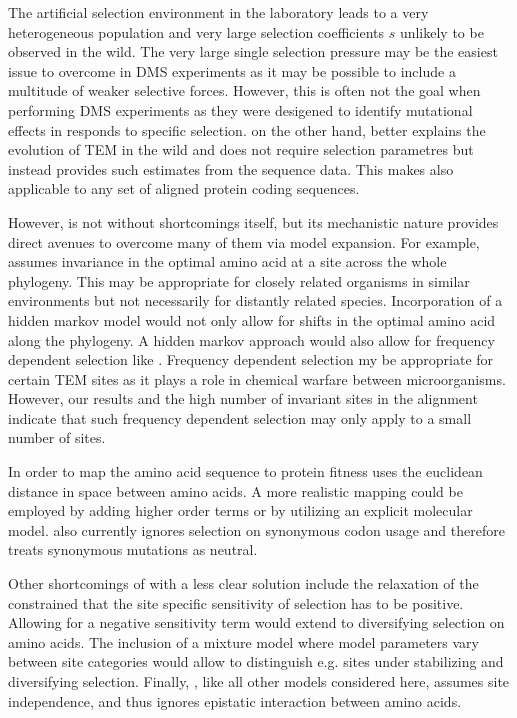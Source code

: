 The artificial selection environment in the laboratory leads to a very heterogeneous population and very large selection coefficients $s$ unlikely to be observed in the wild.
The very large single selection pressure may be the easiest issue to overcome in DMS experiments as it may be possible to include a multitude of weaker selective forces.
However, this is often not the goal when performing DMS experiments as they were desigened to identify mutational effects in responds to specific selection.
\selac on the other hand, better explains the evolution of TEM in the wild and does not require selection parametres but instead provides such estimates from the sequence data.
This makes \selac also applicable to any set of aligned protein coding sequences.

However, \selac is  not without shortcomings itself, but its mechanistic nature provides direct avenues to overcome many of them via model expansion.
For example, \selac assumes invariance in the optimal amino acid at a site across the whole phylogeny.
This may be appropriate for closely related organisms in similar environments but not necessarily for distantly related species.
Incorporation of a hidden markov model would not only allow for shifts in the optimal amino acid along the phylogeny.
A hidden markov approach would also allow for frequency dependent selection like \gy.
Frequency dependent selection my be appropriate for certain TEM sites as it plays a role in chemical warfare between microorganisms.
However, our results and the high number of invariant sites in the alignment indicate that such frequency dependent selection may only apply to a small number of sites.

In order to map the amino acid sequence to protein fitness \selac uses the euclidean distance in \PC space between amino acids. 
A more realistic mapping could be employed by adding higher order terms or by utilizing an explicit molecular model.
\selac also currently ignores selection on synonymous codon usage and therefore treats synonymous mutations as neutral.

Other shortcomings of \selac with a less clear solution include the relaxation of the constrained that the site specific sensitivity of selection has to be positive.
Allowing for a negative sensitivity term would extend \selac to diversifying selection on amino acids.
The inclusion of a mixture model where model parameters vary between site categories would allow to distinguish e.g. sites under stabilizing and diversifying selection.
Finally, \selac, like all other models considered here, assumes site independence, and thus ignores epistatic interaction between amino acids.

